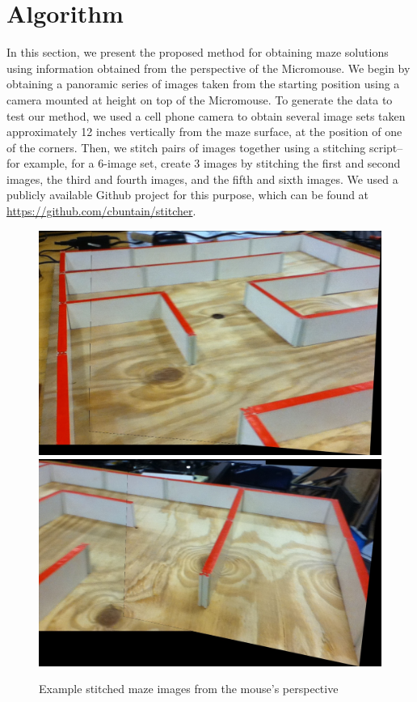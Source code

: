 \documentclass[10pt,twocolumn,letterpaper]{article}
\begin{document}
\section{Algorithm}
\label{sec:algorithm}
In this section, we present the proposed method for obtaining maze solutions using information obtained from the
perspective of the Micromouse.  We begin by obtaining a panoramic series of images taken from the starting position
using a camera mounted at height on top of the Micromouse.  To generate the data to test our method, we used a cell
phone camera to obtain several image sets taken approximately 12 inches vertically from the maze surface, at the
position of one of the corners.  Then, we stitch pairs of images together using a stitching script-- for example, for a
6-image set, create 3 images by stitching the first and second images, the third and fourth images, and the fifth and
sixth images.  We used a publicly available Github project for this purpose, which can be found at
\url{https://github.com/cbuntain/stitcher}.

\begin{figure}[t]
\begin{center}
	\includegraphics[width=0.8\linewidth]{../../src/imgs/one.jpg}
	\includegraphics[width=0.8\linewidth]{../../src/imgs/three.jpg}
\end{center}
\caption{Example stitched maze images from the mouse's perspective}
\label{fig:stitched}
\end{figure}
\end{document}
